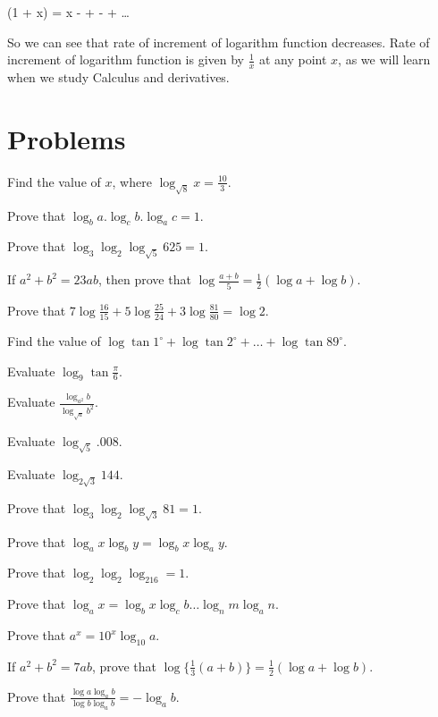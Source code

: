 \startformula\log(1 + x) = x -  +  -  + \ldots\stopformula


So we can see that rate of increment of logarithm function decreases. Rate of increment of logarithm function is given by
$\frac{1}{x}$ at any point $x$, as we will learn when we study Calculus and derivatives.

\section{Problems}
\startitemize[n]
\item Find the value of $x$, where $\log_{\sqrt{8}} x = \frac{10}{3}$.
\item Prove that $\log_ba.\log_cb.\log_ac = 1$.
\item Prove that $\log_3\log_2\log_{\sqrt{5}}625 = 1$.
\item If $a^2 + b^2 = 23ab$, then prove that $\log\frac{a + b}{5} = \frac{1}{2}(\log a + \log b)$.
\item Prove that $7\log\frac{16}{15} + 5\log\frac{25}{24} + 3\log\frac{81}{80} = \log 2$.
\item Find the value of $\log\tan1^\circ + \log\tan2^\circ + \ldots + \log\tan89^\circ$.
\item Evaluate $\log_9\tan\frac{\pi}{6}$.
\item Evaluate $\frac{\log_{a^2}b}{\log_{\sqrt{a}}b^2}$.
\item Evaluate $\log_{\sqrt{5}}.008$.
\item Evaluate $\log_{2\sqrt{3}}144$.
\item Prove that $\log_3\log_2\log_{\sqrt{3}}81 = 1$.
\item Prove that $\log_ax\log_by = \log_bx\log_ay$.
\item Prove that $\log_2\log_2\log_216 = 1$.
\item Prove that $\log_ax = \log_bx\log_cb\ldots\log_nm\log_an$.
\item Prove that $a^x = 10^x\log_{10}a$.
\item If $a^2 + b^2 = 7ab$, prove that $\log\{\frac{1}{3}(a + b)\} = \frac{1}{2}(\log a + \log b)$.
\item Prove that $\frac{\log a\log_ab}{\log b\log_ab} = -\log_ab$.
